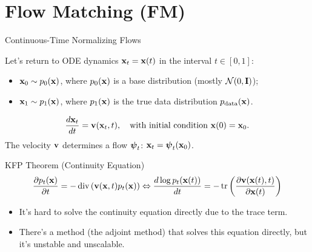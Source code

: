 \documentclass{beamer}
\renewcommand{\eqpause}{}
\begin{document}
\section{Flow Matching (FM)}
\begin{frame}{Continuous-Time Normalizing Flows}

	Let's return to ODE dynamics $\mathbf{x}_t = \mathbf{x}(t)$ in the interval $t \in [0, 1]$:
	\begin{itemize}
		\item $\mathbf{x}_0 \sim p_0(\mathbf{x})$, where $p_0(\mathbf{x})$ is a base distribution (mostly $\mathcal{N}(0, \mathbf{I})$);
		\item $\mathbf{x}_1 \sim p_1(\mathbf{x})$, where $p_1(\mathbf{x})$ is the true data distribution $p_{\text{data}}(\mathbf{x})$.
	\end{itemize}
	\[
		\frac{d \mathbf{x}_t}{dt} = \mathbf{v} (\mathbf{x}_t, t),  \quad \text{with initial condition } \mathbf{x}(0) = \mathbf{x}_0.
	\]
	The velocity $\mathbf{v}$ determines a flow $\boldsymbol{\psi}_t$: $\mathbf{x}_t = \boldsymbol{\psi}_t(\mathbf{x}_0)$.
    \eqpause
	\begin{block}{KFP Theorem (Continuity Equation)}
		\vspace{-0.5cm}
		\[
			\frac{\partial p_t(\mathbf{x})}{\partial t} = - \operatorname{div}\left(\mathbf{v}(\mathbf{x}, t) p_t(\mathbf{x})\right) \Leftrightarrow \frac{d \log p_t(\mathbf{x}(t))}{d t} = - \operatorname{tr} \left( \frac{\partial \mathbf{v}(\mathbf{x}(t), t)}{\partial \mathbf{x}(t)} \right)
		\]
		\vspace{-0.5cm}
	\end{block}
    \eqpause
	\begin{itemize}
		\item It's hard to solve the continuity equation directly due to the trace term.
		\item There's a method (the adjoint method) that solves this equation directly, but it's unstable and unscalable.
	\end{itemize}
\end{frame}
\end{document}
